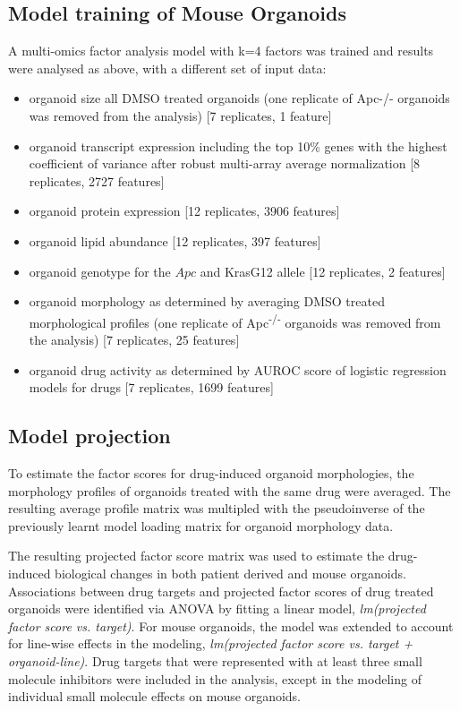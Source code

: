 \begin{flushleft}
\subsection{Model training of Mouse Organoids}
A multi-omics factor analysis model with k=4 factors was trained and results were analysed as above, with a different set of input data: 
\begin{itemize}
    \item organoid size all DMSO treated organoids (one replicate of Apc-/- organoids was removed from the analysis) [7 replicates, 1 feature]
    \item organoid transcript expression including the top 10\% genes with the highest coefficient of variance after robust multi-array average normalization [8 replicates, 2727 features]
    \item organoid protein expression [12 replicates, 3906 features]
    \item organoid lipid abundance [12 replicates, 397 features]
    \item organoid genotype for the $Apc$ and KrasG12 allele [12 replicates, 2 features]
    \item organoid morphology as determined by averaging DMSO treated morphological profiles (one replicate of Apc\textsuperscript{-/-} organoids was removed from the analysis) [7 replicates, 25 features]
    \item organoid drug activity as determined by AUROC score of logistic regression models for drugs [7 replicates, 1699 features]
\end{itemize}


\subsection{Model projection}
To estimate the factor scores for drug-induced organoid morphologies, the morphology profiles of organoids treated with the same drug were averaged. The resulting average profile matrix was multipled with the pseudoinverse of the previously learnt model loading matrix for organoid morphology data. 

\smallbreak
The resulting projected factor score matrix was used to estimate the drug-induced biological changes in both patient derived and mouse organoids. Associations between drug targets and projected factor scores of drug treated organoids were identified via ANOVA by fitting a linear model, \textit{lm(projected factor score vs. target)}. For mouse organoids, the model was extended to account for line-wise effects in the modeling, \textit{lm(projected factor score vs. target + organoid-line)}. Drug targets that were represented with at least three small molecule inhibitors were included in the analysis, except in the modeling of individual small molecule effects on mouse organoids.

\end{flushleft}